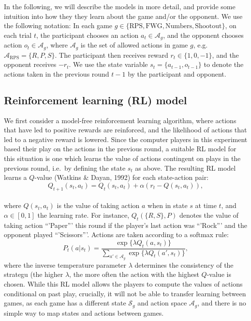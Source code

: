 \documentclass[man,floatsintext]{apa6}
\begin{document}
In the following, we will describe the models in more detail, and provide some intuition into how they they learn about the game and/or the opponent. We use the following notation: In each game \(g \in \{\text{RPS},\text{FWG}, \text{Numbers}, \text{Shootout} \}\), on each trial \(t\), the participant chooses an action \(a_t \in \mathcal{A}_g\), and the opponent chooses action \(o_t \in \mathcal{A}_g\), where \(\mathcal{A}_g\) is the set of allowed actions in game \(g\), e.g. \(\mathcal{A}_\text{RPS} = \{R,P,S\}\). The participant then receives reward \(r_t \in \{1,0,-1\}\), and the opponent receives \(-r_t\). We use the state variable \(s_t = \{a_{t-1},o_{t-1}\}\) to denote the actions taken in the previous round \(t-1\) by the participant and opponent.

\hypertarget{reinforcement-learning-rl-model}{%
\subsection{Reinforcement learning (RL) model}\label{reinforcement-learning-rl-model}}

We first consider a model-free reinforcement learning algorithm, where actions that have led to positive rewards are reinforced, and the likelihood of actions that led to a negative reward is lowered. Since the computer players in this experiment based their play on the actions in the previous round, a suitable RL model for this situation is one which learns the value of actions contingent on plays in the previous round, i.e.~by defining the state \(s_{t}\) as above. The resulting RL model learns a \(Q\)-value (Watkins \& Dayan, 1992) for each state-action pair:
\[ Q_{t+1}(s_{t},a_{t}) = Q_{t}(s_{t},a_{t}) + \alpha \left( r_{t}  - Q(s_{t},a_{t}) \right) ,\]\\
where \(Q(s_{t},a_{t})\) is the value of taking action \(a\) when in state \(s\) at time \(t\), and \(\alpha \in [0,1]\) the learning rate. For instance, \(Q_t(\{R,S\},P)\) denotes the value of taking action \enquote{'Paper}' this round if the player's last action was \enquote{'Rock}' and the opponent played \enquote{'Scissors}'. Actions are taken according to a softmax rule:
\[P_{t}(a|s_t) = \frac{\exp \{ \lambda Q_{t}(a,s_t) \}}{\sum_{a' \in \mathcal{A}_g} \exp \{\lambda  Q_{t}(a',s_t) \}}, \]
where the inverse temperature parameter \(\lambda\) determines the consistency of the strategu (the higher \(\lambda\), the more often the action with the highest \(Q\)-value is chosen. While this RL model allows the players to compute the values of actions conditional on past play, crucially, it will not be able to transfer learning between games, as each game has a different state \(\mathcal{S}_g\) and action space \(\mathcal{A}_g\), and there is no simple way to map states and actions between games.
\end{document}
